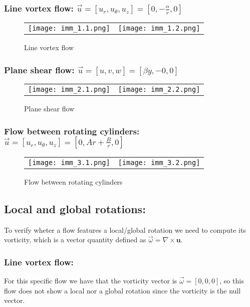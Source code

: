 \documentclass{article}
\begin{document}
\subsubsection*{Line vortex flow: \textnormal{$\vec{u} = [u_r, u_\theta, u_z] = \left[0, -\frac{\alpha}{r}, 0\right]$ }}
\begin{figure}[h!]
    \centering
    \begin{tabular}{cc}
        \texttt{[image: imm\_1.1.png]} &
        \texttt{[image: imm\_1.2.png]}
    \end{tabular}
    \caption{Line vortex flow}
    \label{fig:mie_immagini}
\end{figure}
\subsubsection*{Plane shear flow: \textnormal{$\vec{u} = [u, v, w] = \left[\beta y, -0, 0\right]$}} 
\begin{figure}[h!]
    \centering
    \begin{tabular}{cc}
        \texttt{[image: imm\_2.1.png]} &
        \texttt{[image: imm\_2.2.png]}
    \end{tabular}
    \caption{Plane shear flow}
    \label{fig:mie_immagini}
\end{figure}
\subsubsection*{Flow between rotating cylinders: \textnormal{$\vec{u} = [u_r, u_\theta, u_z] = \left[0, Ar + \frac{B}{r}, 0\right]$}} 
\begin{figure}[h!]
    \centering
    \begin{tabular}{cc}
        \texttt{[image: imm\_3.1.png]} &
        \texttt{[image: imm\_3.2.png]}
    \end{tabular}
    \caption{Flow between rotating cylinders}
    \label{fig:mie_immagini}
\end{figure}


\subsection{Local and global rotations:}
To verify wheter a flow features a local/global rotation we need to compute its vorticity, which is a vector quantity defined as $\vec{\omega} = \nabla \times \mathbf{u}$.
\subsubsection*{Line vortex flow:}
For this specific flow we have that the vorticity vector is $\vec{\omega} = [0, 0, 0]$, so this flow does not show a local nor a global rotation since the vorticity is the null vector.
\end{document}
